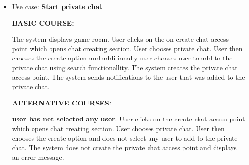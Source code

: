 \documentclass[]{VUMIFTemplateClass}
\begin{document}
\begin{itemize}
    \textbf{user has not selected any users:}
    User clicks on the group chat access point which opens group chat section. Then user clicks on the edit group button which opens group edditing section. User does not select any users to add to the group chat. The system displays an informational message.

    \textbf{the group chat is already deleted:}
    User clicks on the group chat access point which opens group chat section. Then user clicks on the edit group button which opens group edditing section. The system does not allow the user to add or remove users from the group chat and displays an error message that the group chat is already deleted.

    \textbf{the group chat is already full:}
    User clicks on the group chat access point which opens group chat section. Then user clicks on the edit group button which opens group edditing section. User tries to add users to the group chat but the group chat is already full (100+ users). The system does not allow the user to add users to the group chat and displays an error message.

    \textbf{user has selected too many users:}
    User clicks on the group chat access point which opens group chat section. Then user clicks on the edit group button which opens group edditing section. User tries to add too many users (100+) to the group chat. The system does not allow the user to add users to the group chat and displays an error message.

    \item 
    Use case: \textbf{Start private chat}

    \textbf{BASIC COURSE:}

    The system displays game room. User clicks on the on create chat access point which opens chat creating section. User chooses private chat. User then chooses the create option and additionally user chooses user to add to the private chat using search functionallity. The system creates the private chat access point. The system sends notifications to the user that was added to the private chat.

    \textbf{ALTERNATIVE COURSES:}

    \textbf{user has not selected any user:}
    User clicks on the create chat access point which opens chat creating section. User chooses private chat. User then chooses the create option and does not select any user to add to the private chat. The system does not create the private chat access point and displays an error message.


\end{itemize}
\end{document}
